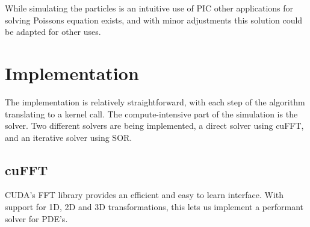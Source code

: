 \documentclass[10pt,a4paper,twocolumns]{article}
\begin{document}
\begin{multicols*}{2}
		While simulating the particles is an intuitive use of PIC
		other applications for solving Poissons equation exists, and
		with minor adjustments this solution could be adapted for
		other uses.
		
		\section*{Implementation}
		The implementation is relatively straightforward, with each
		step of the algorithm translating to a kernel call. The
		compute-intensive part of the simulation is the solver.
		Two different solvers are being implemented, a direct solver
		using cuFFT, and an iterative solver using SOR.
		
		\subsection*{cuFFT}
		CUDA's FFT library provides an efficient and easy to learn
		interface. With support for 1D, 2D and 3D transformations,
		this lets us implement a performant solver for PDE's.
		
	\end{multicols*}
\end{document}
